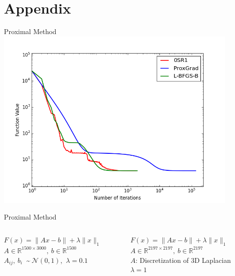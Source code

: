 \documentclass[10pt]{beamer}
\begin{document}
\section{Appendix}
\begin{frame}{Proximal Method}
	\centering\includegraphics[width = 0.9\textwidth]{ProxNormal_full.png}
\end{frame}
\begin{frame}{Proximal Method}
	\begin{columns}[T]
		\begin{column}{.5\textwidth}
			$F(x) = \lVert Ax - b \rVert + \lambda \lVert x \rVert_1$\\
			$A \in \mathbb{R}^{1500 \times 3000},\:b \in \mathbb{R}^{1500}$\\
			$A_{ij},\:b_i\:$ \textasciitilde $\:\mathcal{N}(0,1)$, $\:\lambda = 0.1$\\
			\vspace{28pt}
			\resizebox{\linewidth}{!}{}
		\end{column}\hfill
		\begin{column}{.5\textwidth}
			$F(x) = \lVert Ax - b \rVert + \lambda \lVert x \rVert_1$\\
			$A \in \mathbb{R}^{2197 \times 2197},\:b \in \mathbb{R}^{2197}$\\
			$A$: \small Discretization of 3D Laplacian\\
			\normalsize$\lambda = 1$\\
			\vspace{10pt}
			\resizebox{\linewidth}{!}{}
		\end{column}
	\end{columns}
\end{frame}
\end{document}
